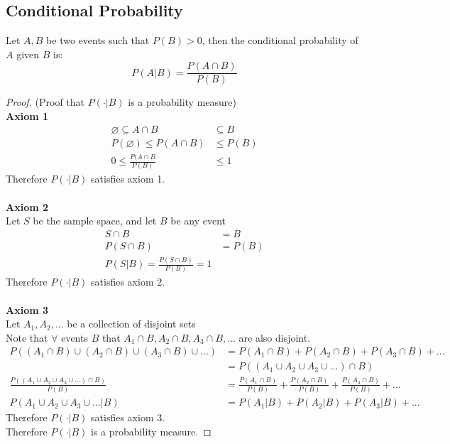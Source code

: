 \documentclass[12pt, twoside]{article}
\begin{document}
\subsection{Conditional Probability}

\begin{tcolorbox}[title=Conditional Probability]
	Let $A,B$ be two events such that $P(B) > 0$, then the conditional probability of $A$ given $B$ is:
	$$P(A | B) = \frac{P(A \cap B)}{P(B)}$$
\end{tcolorbox}

\begin{proof}
	(Proof that $P(\cdot | B)$ is a probability measure)\\
	\textbf{Axiom 1}\\
	\begin{align*}
		\varnothing \subseteq A \cap B &\subseteq B\\
		P(\varnothing) \leq P(A \cap B) &\leq P(B)\\
		0 \leq \frac{P(A \cap B}{P(B)} &\leq 1
	\end{align*}
	Therefore $P(\cdot | B)$ satisfies axiom 1.\\
	\\
	\textbf{Axiom 2}\\
	Let $S$ be the sample space, and let $B$ be any event\\
	\begin{align*}
		S \cap B &= B\\
		P(S \cap B) &= P(B)\\
		P(S | B) = \frac{P(S \cap B)}{P(B)} = 1
	\end{align*}
	Therefore $P(\cdot | B)$ satisfies axiom 2.\\
	\\
	\textbf{Axiom 3}\\
	Let $A_1, A_2, ...$ be a collection of disjoint sets\\
	Note that $\forall$ events $B$ that $A_1 \cap B, A_2 \cap B,A_3 \cap B, ...$ are also disjoint.
	\begin{align*}
		P((A_1 \cap B) \cup (A_2 \cap B) \cup (A_3 \cap B) \cup ...) &= P(A_1 \cap B) + P(A_2 \cap B) + P(A_3 \cap B) + ...\\
		&= P((A_1 \cup A_2 \cup A_3 \cup ...) \cap B)\\
		\frac{P((A_1 \cup A_2 \cup A_3 \cup ...) \cap B)}{P(B)} &= \frac{P(A_1 \cap B)}{P(B)} + \frac{P(A_2 \cap B)}{P(B)} + \frac{P(A_3 \cap B)}{P(B)} + ...\\
		P(A_1 \cup A_2 \cup A_3 \cup ...  | B) &= P(A_1 | B) + P(A_2 | B) + P(A_3 | B) + ...
	\end{align*}
	Therefore $P(\cdot | B)$ satisfies axiom 3.\\
	Therefore $P(\cdot | B)$ is a probability measure.
\end{proof}
\end{document}
